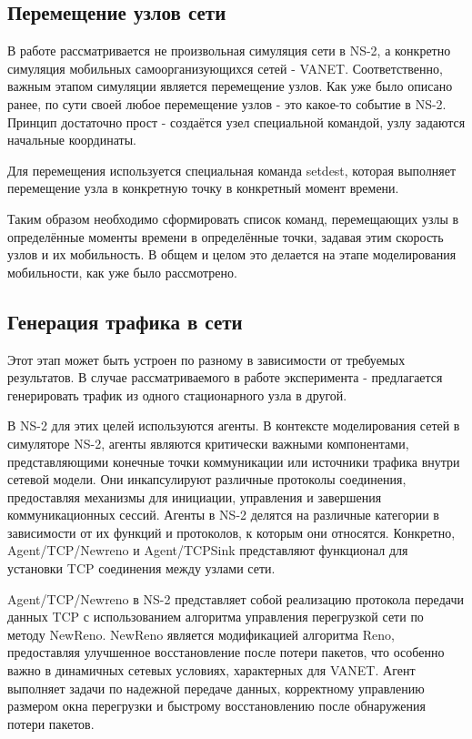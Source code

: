 \subsection*{Перемещение узлов сети}

В работе рассматривается не произвольная симуляция сети в NS-2, а конкретно симуляция мобильных самоорганизующихся сетей - VANET. Соответственно, важным этапом симуляции является перемещение узлов. Как уже было описано ранее, по сути своей любое перемещение узлов - это какое-то событие в NS-2. Принцип достаточно прост - создаётся узел специальной командой, узлу задаются начальные координаты.

Для перемещения используется специальная команда setdest, которая выполняет перемещение узла в конкретную точку в конкретный момент времени.

Таким образом необходимо сформировать список команд, перемещающих узлы в определённые моменты времени в определённые точки, задавая этим скорость узлов и их мобильность. В общем и целом это делается на этапе моделирования мобильности, как уже было рассмотрено.

\subsection*{Генерация трафика в сети}

Этот этап может быть устроен по разному в зависимости от требуемых результатов. В случае рассматриваемого в работе эксперимента - предлагается генерировать трафик из одного стационарного узла в другой.

В NS-2 для этих целей используются агенты. В контексте моделирования сетей в симуляторе NS-2, агенты являются критически важными компонентами, представляющими конечные точки коммуникации или источники трафика внутри сетевой модели. Они инкапсулируют различные протоколы соединения, предоставляя механизмы для инициации, управления и завершения коммуникационных сессий. Агенты в NS-2 делятся на различные категории в зависимости от их функций и протоколов, к которым они относятся. Конкретно, Agent/TCP/Newreno и Agent/TCPSink представляют функционал для установки TCP соединения между узлами сети.

Agent/TCP/Newreno в NS-2 представляет собой реализацию протокола передачи данных TCP с использованием алгоритма управления перегрузкой сети по методу NewReno. NewReno является модификацией алгоритма Reno, предоставляя улучшенное восстановление после потери пакетов, что особенно важно в динамичных сетевых условиях, характерных для VANET. Агент выполняет задачи по надежной передаче данных, корректному управлению размером окна перегрузки и быстрому восстановлению после обнаружения потери пакетов.

